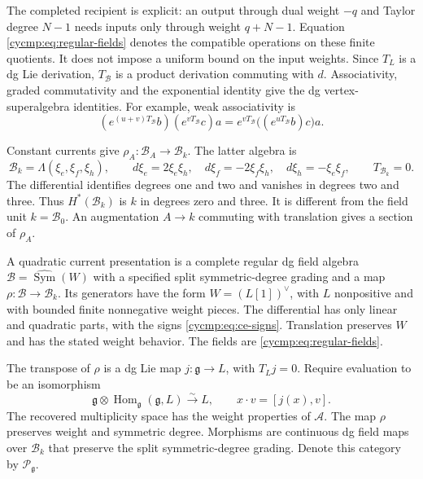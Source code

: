 The completed recipient is explicit: an output through dual weight
$-q$ and Taylor degree $N-1$ needs inputs only through weight
$q+N-1$. Equation \eqref{cycmp:eq:regular-fields} denotes the
compatible operations on these finite quotients. It does not
impose a uniform bound on the input weights. Since $T_L$ is a dg
Lie derivation, $T_{\mathcal B}$ is a product derivation commuting
with $d$. Associativity, graded commutativity and the exponential
identity give the dg vertex-superalgebra identities. For example,
weak associativity is
\[
 (e^{(u+v)T_{\mathcal B}}b)(e^{vT_{\mathcal B}}c)a
 =e^{vT_{\mathcal B}}\bigl((e^{uT_{\mathcal B}}b)c\bigr)a.
\]

Constant currents give $\rho_A:\mathcal B_A\to\mathcal B_k$.
The latter algebra is
\[
 \mathcal B_k=\Lambda(\xi_e,\xi_f,\xi_h),\qquad
 d\xi_e=2\xi_e\xi_h,\quad
 d\xi_f=-2\xi_f\xi_h,\quad d\xi_h=-\xi_e\xi_f,
 \qquad T_{\mathcal B_k}=0.
\]
The differential identifies degrees one and two and vanishes in
degrees two and three. Thus $H^*(\mathcal B_k)$ is $k$ in
degrees zero and three. It is different from the field unit
$k=\mathcal B_0$. An augmentation $A\to k$ commuting with
translation gives a section of $\rho_A$.

\begin{definition}\label{cycmp:def:current-presentation}
A quadratic current presentation is a complete regular dg field
algebra $\mathcal B=\widehat{\operatorname{Sym}}(W)$ with a specified
split symmetric-degree grading and a map
$\rho:\mathcal B\to\mathcal B_k$. Its generators have the form
$W=(L[1])^\vee$, with $L$ nonpositive and with bounded finite
nonnegative weight pieces. The differential has only linear and
quadratic parts, with the signs \eqref{cycmp:eq:ce-signs}.
Translation preserves $W$ and has the stated weight behavior.
The fields are \eqref{cycmp:eq:regular-fields}.

The transpose of $\rho$ is a dg Lie map $j:\mathfrak g\to L$,
with $T_Lj=0$. Require evaluation to be an isomorphism
\begin{equation}\label{cycmp:eq:isotypic}
 \mathfrak g\otimes\operatorname{Hom}_{\mathfrak g}(\mathfrak g,L)
       \xrightarrow{\sim}L,
 \qquad x\cdot v=[j(x),v].
\end{equation}
The recovered multiplicity space has the weight properties of
$\mathcal A$. The map $\rho$ preserves weight and symmetric degree.
Morphisms are continuous dg field maps over $\mathcal B_k$ that
preserve the split symmetric-degree grading. Denote this category
by $\mathcal P_{\mathfrak g}$.
\end{definition}

